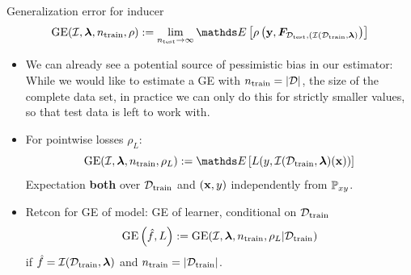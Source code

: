 \documentclass[11pt,compress,t,notes=noshow, xcolor=table]{beamer}
\begin{document}
\begin{vbframe}{Generalization error for inducer}
  $$\GEfull := 
  \lim_{\ntest \rightarrow \infty} \E \left[ \rho \left(
  \yv, \F_{\Dtest, (\ind(\D_{\mathrm{train}}, \lamv)} 
  \right)\right]$$
\begin{itemize}
  \item We can already see a potential source of pessimistic bias in our
      estimator: While we would like to estimate a GE with 
      $n_{\mathrm{train}} = |\mathcal{D}|$, the size of the complete data set, 
      in practice we can only do this for strictly smaller values, so that test data is left to work with.
  \item For pointwise losses $\rho_L$:
      $$\GE(\ind, \lamv, n_\mathrm{train}, \rho_L) := 
      \E \left[ L(y, \ind(\D_{\mathrm{train}}, \lamv)(\xv)) \right]$$
  Expectation \textbf{both} over $\mathcal{D}_{\text{train}}$ and $(\mathbf{x},y)$ independently from $\mathbb{P}_{xy}$.
 \item Retcon for GE of model: GE of learner, conditional on $\mathcal{D}_{\text{train}}$
     $$\mathrm{GE}\left(\hat{f}, L\right) := \mathrm{GE}(\mathcal{I}, \bm{\lambda}, n_{\mathrm{train}}, \rho_L | \mathcal{D}_{\text{train}}) $$
   if $\hat{f} = \mathcal{I}(\mathcal{D}_{\text{train}}, \bm{\lambda})$ and $n_\mathrm{train} = |\mathcal{D}_{\text{train}}|$.
\end{itemize}



\end{vbframe}







\endlecture
\end{document}
